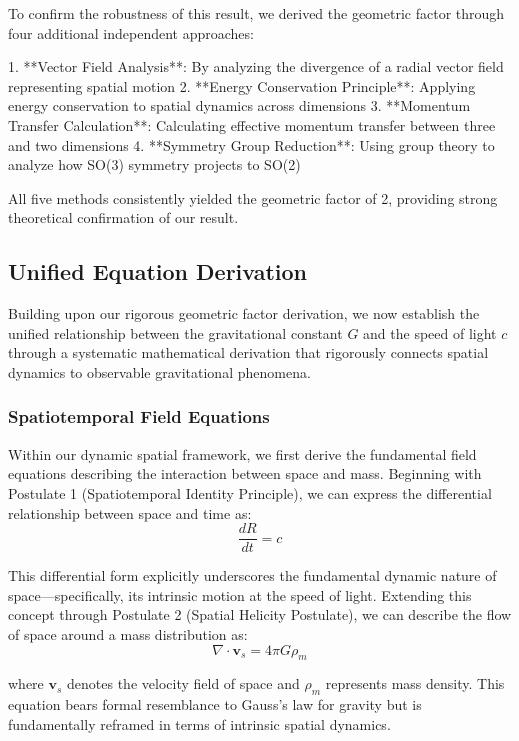 \documentclass[12pt]{article}
\numberwithin{equation}{section}
\begin{document}
To confirm the robustness of this result, we derived the geometric factor through four additional independent approaches:

1. **Vector Field Analysis**: By analyzing the divergence of a radial vector field representing spatial motion
2. **Energy Conservation Principle**: Applying energy conservation to spatial dynamics across dimensions
3. **Momentum Transfer Calculation**: Calculating effective momentum transfer between three and two dimensions
4. **Symmetry Group Reduction**: Using group theory to analyze how SO(3) symmetry projects to SO(2)

All five methods consistently yielded the geometric factor of 2, providing strong theoretical confirmation of our result.

\subsection{Unified Equation Derivation}

Building upon our rigorous geometric factor derivation, we now establish the unified relationship between the gravitational constant $G$ and the speed of light $c$ through a systematic mathematical derivation that rigorously connects spatial dynamics to observable gravitational phenomena.

\subsubsection{Spatiotemporal Field Equations}

Within our dynamic spatial framework, we first derive the fundamental field equations describing the interaction between space and mass. Beginning with Postulate 1 (Spatiotemporal Identity Principle), we can express the differential relationship between space and time as:
\begin{equation}
\frac{dR}{dt} = c
\label{eq:spatiotemporal_derivative}
\end{equation}

This differential form explicitly underscores the fundamental dynamic nature of space—specifically, its intrinsic motion at the speed of light. Extending this concept through Postulate 2 (Spatial Helicity Postulate), we can describe the flow of space around a mass distribution as:
\begin{equation}
\nabla \cdot \mathbf{v}_s = 4\pi G\rho_m
\label{eq:spatial_flow}
\end{equation}

where $\mathbf{v}_s$ denotes the velocity field of space and $\rho_m$ represents mass density. This equation bears formal resemblance to Gauss's law for gravity but is fundamentally reframed in terms of intrinsic spatial dynamics.
\end{document}
